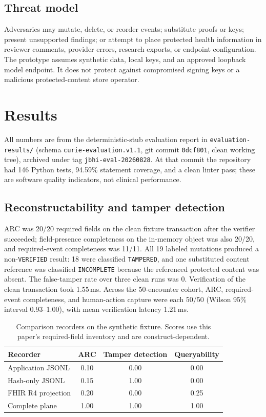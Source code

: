 \documentclass[preprint,review,12pt]{elsarticle}
\begin{document}
\subsection{Threat model}
\label{sec:threat}

Adversaries may mutate, delete, or reorder events; substitute proofs or keys;
present unsupported findings; or attempt to place protected health
information in reviewer comments, provider errors, research exports, or
endpoint configuration. The prototype assumes synthetic data, local keys, and
an approved loopback model endpoint. It does not protect against compromised
signing keys or a malicious protected-content store operator.

\section{Results}
\label{sec:results}

All numbers are from the deterministic-stub evaluation report in
\texttt{evaluation-results/} (schema \texttt{curie-evaluation.v1.1}, git commit
\texttt{0dcf801}, clean working tree), archived under tag
\texttt{jbhi-eval-20260828}. At that commit the repository had 146 Python
tests, 94.59\% statement coverage, and a clean linter pass; these are software
quality indicators, not clinical performance.

\subsection{Reconstructability and tamper detection}

ARC was 20/20 required fields on the clean fixture transaction after the
verifier succeeded; field-presence completeness on the in-memory object was
also 20/20, and required-event completeness was 11/11. All 19 labeled
mutations produced a non-\texttt{VERIFIED} result: 18 were classified
\texttt{TAMPERED}, and one substituted content reference was classified
\texttt{INCOMPLETE} because the referenced protected content was absent. The
false-tamper rate over three clean runs was 0. Verification of the clean
transaction took 1.55\,ms. Across the 50-encounter cohort, ARC,
required-event completeness, and human-action capture were each 50/50 (Wilson
95\% interval 0.93--1.00), with mean verification latency 1.21\,ms.

\begin{table}[t]
\centering
\caption{Comparison recorders on the synthetic fixture. Scores use this
paper's required-field inventory and are construct-dependent.}
\label{tab:baselines}
\begin{tabular}{lccc}
\toprule
Recorder & ARC & Tamper detection & Queryability \\
\midrule
Application JSONL & 0.10 & 0.00 & 0.00 \\
Hash-only JSONL & 0.15 & 1.00 & 0.00 \\
FHIR R4 projection & 0.20 & 0.00 & 0.25 \\
Complete plane & 1.00 & 1.00 & 1.00 \\
\bottomrule
\end{tabular}
\end{table}
\end{document}
